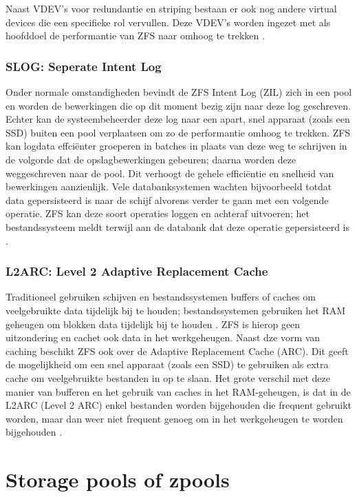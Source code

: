 Naast VDEV's voor redundantie en \gls{striping} bestaan er ook nog andere virtual devices die een specifieke rol vervullen. Deze VDEV's worden ingezet met als hoofddoel de \gls{performantie} van ZFS naar omhoog te trekken \autocite{Lucas2015}.

\subsubsection{SLOG: Seperate Intent Log}

Onder normale omstandigheden bevindt de ZFS Intent Log (ZIL) zich in een pool en worden de bewerkingen die op dit moment bezig zijn naar deze log geschreven. Echter kan de systeembeheerder deze log naar een apart, snel apparaat (zoals een SSD) buiten een pool verplaatsen om zo de \gls{performantie} omhoog te trekken. ZFS kan logdata effciënter groeperen in batches in plaats van deze weg te schrijven in de volgorde dat de opslagbewerkingen gebeuren; daarna worden deze weggeschreven naar de pool. Dit verhoogt de gehele efficiëntie en snelheid van bewerkingen aanzienlijk. Vele databanksystemen wachten bijvoorbeeld totdat data gepersisteerd is naar de schijf alvorens verder te gaan met een volgende operatie. ZFS kan deze soort operaties loggen en achteraf uitvoeren; het bestandssysteem meldt terwijl aan de databank dat deze operatie gepersisteerd is \autocite{Lucas2015}.

\subsubsection{L2ARC: Level 2 Adaptive Replacement Cache}

Traditioneel gebruiken schijven en bestandssystemen buffers of caches om veelgebruikte data tijdelijk bij te houden; bestandssystemen gebruiken het RAM geheugen om blokken data tijdelijk bij te houden \autocite{OSThreePiecesRemzi2015}. ZFS is hierop geen uitzondering en cachet ook data in het werkgeheugen. Naast dze vorm van caching beschikt ZFS ook over de Adaptive Replacement Cache (ARC). Dit geeft de mogelijkheid om een snel apparaat (zoals een SSD) te gebruiken als extra cache om veelgebruikte bestanden in op te slaan. Het grote verschil met deze manier van bufferen en het gebruik van caches in het RAM-geheugen, is dat in de L2ARC (Level 2 ARC) enkel bestanden worden bijgehouden die frequent gebruikt worden, maar dan weer niet frequent genoeg om in het werkgeheugen te worden bijgehouden \autocite{Lucas2015}. 

\section{Storage pools of zpools}

